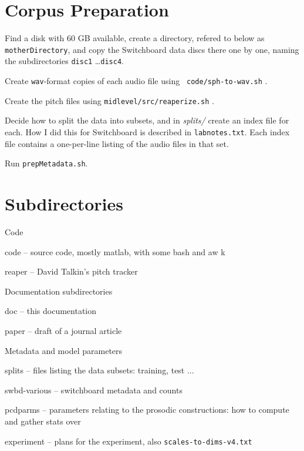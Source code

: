 \documentclass[11pt]{article}
\begin{document}
\section{Corpus Preparation }

Find a disk with 60 GB available, create a directory, refered to below
as {\tt motherDirectory}, and copy the Switchboard data discs there
one by one, naming the subdirectories {\tt disc1} \ldots {\tt disc4}.

Create {\tt wav}-format copies of each audio file using {\tt
  code/sph-to-wav.sh} .

Create the pitch files using {\tt midlevel/src/reaperize.sh} .

Decide how to split the data into subsets, and in {\it splits/} create
an index file for each. How I did this for Switchboard is described in
{\tt labnotes.txt}.  Each index file contains a one-per-line listing
of the audio files in that set.

Run {\tt prepMetadata.sh}.

\section{Subdirectories}

Code 
\begin{description}   \setlength{\itemsep}{0pt}\setlength{\parskip}{0pt}
\item{code} -- source code, mostly matlab, with some bash and aw k
\item{reaper} --  David Talkin's pitch tracker 
\end{description}

Documentation subdirectories 
\begin{description}  \setlength{\itemsep}{0pt}\setlength{\parskip}{0pt}
\item{doc} -- this documentation
\item{paper} -- draft of a journal article
\end{description}

Metadata and model parameters 
\begin{description}  \setlength{\itemsep}{0pt}\setlength{\parskip}{0pt}
\item{splits} -- files listing the data subsets: training, test ...
\item{swbd-various} -- switchboard metadata and counts
\item{pcdparms} -- parameters relating to the prosodic constructions: how to compute and gather stats over 
\item{experiment} -- plans for the experiment, also {\tt scales-to-dims-v4.txt}
\end{description} 
\end{document}
